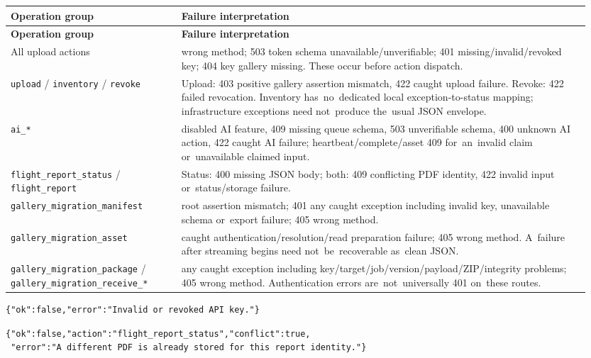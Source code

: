 \documentclass[11pt,a4paper]{article}
\newcommand{\codeword}[1]{\nolinkurl{#1}}
\begin{document}
\begin{longtable}{@{}>{\RaggedRight\arraybackslash}p{0.28\linewidth}>{\RaggedRight\arraybackslash}p{0.67\linewidth}@{}}
\toprule
\textbf{Operation group} & \textbf{Failure interpretation} \\
\midrule
\endfirsthead
\toprule
\textbf{Operation group} & \textbf{Failure interpretation} \\
\midrule
\endhead
\bottomrule
\endfoot
All upload actions & 405 wrong method; 503 token schema unavailable/unverifiable; 401
missing/invalid/revoked key; 404 key gallery missing. These occur before action dispatch. \\
\codeword{upload} / \codeword{inventory} / \codeword{revoke} & Upload: 403 positive gallery
assertion mismatch, 422 caught upload failure. Revoke: 422 failed revocation. Inventory
has~no~dedicated local exception-to-status mapping; infrastructure exceptions need
not~produce the~usual JSON envelope. \\
\codeword{ai_*} & 403 disabled AI feature, 409 missing queue schema, 503 unverifiable
schema, 400 unknown AI action, 422 caught AI failure; heartbeat/complete/asset 409
for~an~invalid claim or~unavailable claimed input. \\
\codeword{flight_report_status} / \codeword{flight_report} & Status: 400 missing JSON body;
both: 409 conflicting PDF identity, 422 invalid input or~status/storage failure. \\
\codeword{gallery_migration_manifest} & 403 root assertion mismatch; 401 any caught
exception including invalid key, unavailable schema or~export failure; 405 wrong method. \\
\codeword{gallery_migration_asset} & 404 caught authentication/resolution/read preparation
failure; 405 wrong method. A~failure after streaming begins need not~be~recoverable as~clean
JSON. \\
\codeword{gallery_migration_package} / \codeword{gallery_migration_receive_*} & 422 any
caught exception including key/target/job/version/payload/ZIP/integrity problems; 405 wrong
method. Authentication errors are~not~universally 401 on~these routes. \\
\end{longtable}

\begin{lstlisting}[language={}]
{"ok":false,"error":"Invalid or revoked API key."}
\end{lstlisting}

\begin{lstlisting}[language={}]
{"ok":false,"action":"flight_report_status","conflict":true,
 "error":"A different PDF is already stored for this report identity."}
\end{lstlisting}
\end{document}
